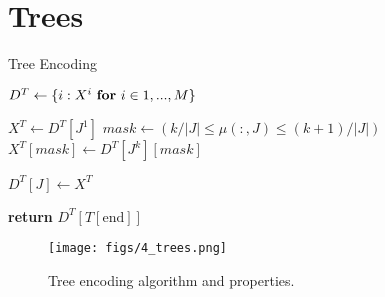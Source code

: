 \documentclass{article}
\begin{document}
\section{Trees}

\begin{algorithm}
\caption{Tree Encoding}

\begin{algorithmic}[0]

\State $D^T \gets \{i: X^i \textrm{ \textbf{for} } i \in 1, ..., M\}$


    \State $X^T \gets D^T[J^1]$
        \State $mask \gets (k/|J| \leq \mu(:, J) \leq (k+1)/|J|)$
        \State $X^T[mask] \gets D^T[J^k][mask]$
    \EndFor
    
    \State $D^T[J] \gets X^T$
\EndFor

\State \textbf{return} $D^T[T[\textrm{end}]]$
\EndFunction

\end{algorithmic}
\end{algorithm}

\begin{figure}[!t]
    \centering
    \texttt{[image: figs/4\_trees.png]}
    \caption{Tree encoding algorithm and properties.}
 \end{figure}
\end{document}
